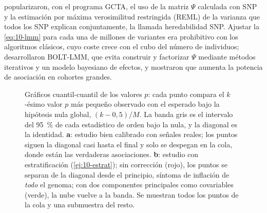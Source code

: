 \textcite{c10-yang2011} popularizaron, con el programa GCTA, el uso de la matriz $\Psi$ calculada con SNP y la estimación por máxima verosimilitud restringida (REML) de la varianza que todos los SNP explican conjuntamente, la llamada heredabilidad SNP. Ajustar la \cref{eq:10-lmm} para cada una de millones de variantes era prohibitivo con los algoritmos clásicos, cuyo coste crece con el cubo del número de individuos; \textcite{c10-loh2015} desarrollaron BOLT-LMM, que evita construir y factorizar $\Psi$ mediante métodos iterativos y un modelo bayesiano de efectos, y mostraron que aumenta la potencia de asociación en cohortes grandes.

\begin{figure}[t]
\centering
{}
\caption[Gráficos QQ]{Gráficos cuantil-cuantil de los valores $p$: cada punto compara el $k$-ésimo valor $p$ más pequeño observado con el esperado bajo la hipótesis nula global, $(k-0{,}5)/M$. La banda gris es el intervalo del \SI{95}{\percent} de cada estadístico de orden bajo la nula, y la diagonal es la identidad. \textbf{a}: estudio bien calibrado con señales reales; los puntos siguen la diagonal casi hasta el final y solo se despegan en la cola, donde están las verdaderas asociaciones. \textbf{b}: estudio con estratificación (\cref{ej:10-estrat}); sin corrección (rojo), los puntos se separan de la diagonal desde el principio, síntoma de inflación de \emph{todo} el genoma; con dos componentes principales como covariables (verde), la nube vuelve a la banda. Se muestran todos los puntos de la cola y una submuestra del resto.}

\end{figure}
